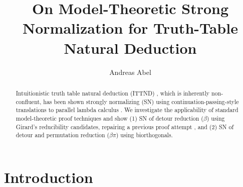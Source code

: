 \documentclass[a4paper,USenglish,cleveref, autoref, thm-restate]{lipics-v2019}
\title{On Model-Theoretic Strong Normalization for Truth-Table Natural Deduction}
\author{Andreas Abel
  }{Department of Computer Science and Engineering,
    Gothenburg University,
    Sweden
  }{andreas.abel@gu.se
  }{https://orcid.org/0000-0003-0420-4492
  }{}
\begin{document}
\maketitle

\begin{abstract}
  Intuitionistic truth table natural deduction (ITTND)
  \cite{geuversHurkens:icla17,geuversHurkens:types17}, which is
  inherently non-confluent, has been shown strongly normalizing (SN)
  using continuation-passing-style translations to parallel lambda
  calculus \cite{geuversGiessenHurkens:fundinf19}.  We investigate the
  applicability of standard model-theoretic proof techniques and show
  (1) SN of detour reduction ($\beta$) using Girard's reducibility
  candidates, repairing a previous proof attempt
  \cite{geuversHurkens:types17}, and (2) SN of detour and permutation
  reduction ($\beta\pi$) using biorthogonals.
\end{abstract}

\section{Introduction}
\label{sec:intro}

%
%
%
%


%
%
%
%
%
\end{document}
